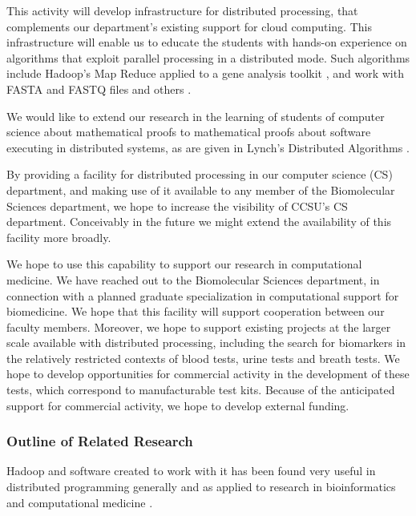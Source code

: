 \documentclass[]{article}
\begin{document}
This activity will  develop infrastructure for distributed processing, that complements our department's existing support for cloud computing. This infrastructure will enable us to educate the students with hands-on experience on algorithms that exploit parallel processing in a distributed mode. Such algorithms include Hadoop's Map Reduce applied to a gene analysis toolkit \cite{mckenna2010genome,taylor2010overview}, and work with FASTA and FASTQ files \cite{ferraro2017fastdoop} and others \cite{cattaneo2016mapreduce}.

We would like to extend our research in the learning of students of computer science about mathematical proofs \cite{smith2013mathematization,smith2014computer,smith2016categories} to mathematical proofs about software executing in distributed systems, as are given in Lynch's Distributed Algorithms \cite{lynch1996distributed}.

By providing a facility for distributed processing in our computer science (CS) department, and making use of it available to any member of the Biomolecular Sciences department, we hope to increase the visibility of CCSU's CS department. Conceivably in the future we might extend the availability of this facility more broadly.

We hope to use this capability to support our research in computational medicine\cite{ammar2013developing,smith1999random}. We have reached out to the Biomolecular Sciences department, in connection with a planned graduate specialization in computational support for biomedicine. We hope that this facility will support cooperation between our faculty members. Moreover, we hope to support existing projects at the larger scale available with distributed processing, including the search for biomarkers in the relatively restricted contexts of blood tests, urine tests and breath tests. We hope to develop opportunities for commercial activity in the development of these tests, which correspond to manufacturable test kits. Because of the anticipated support for commercial activity, we hope to develop external funding.

\subsubsection{Outline of Related Research}%
Hadoop and software created to work with it has been found very useful in distributed programming generally and as applied to research in bioinformatics \cite{taylor2010overview,ferraro2017fastdoop} and computational medicine \cite{wang2011hadoop}.
\end{document}
